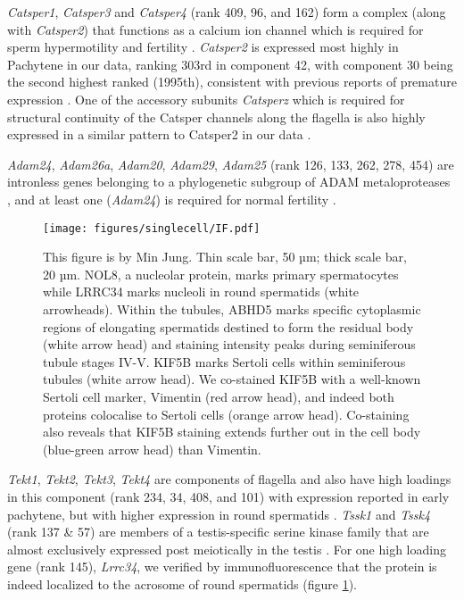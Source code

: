 \textit{Catsper1}, \textit{Catsper3} and \textit{Catsper4} (rank 409, 96, and 162) form a complex (along with \textit{Catsper2}) that functions as a calcium ion channel which is required for sperm hypermotility and fertility \parencite{Ren2001sperm, Lobley2003Identification, Qi2007All, Jin2007Catsper3}.
\textit{Catsper2} is expressed most highly in Pachytene in our data, ranking 303rd in component 42, with component 30 being the second highest ranked (1995th), consistent with previous reports of premature expression \parencite{Schultz2003multitude}.
One of the accessory subunits \textit{Catsperz} which is required for structural continuity of the Catsper channels along the flagella is also highly expressed in a similar pattern to Catsper2 in our data \parencite{Chung2017CatSperz}.

\textit{Adam24}, \textit{Adam26a}, \textit{Adam20}, \textit{Adam29}, \textit{Adam25} (rank 126, 133, 262, 278, 454) are intronless genes belonging to a phylogenetic subgroup of ADAM metaloproteases \parencite{Choi2004Characterization}, and at least one (\textit{Adam24}) is required for normal fertility \parencite{Zhu2009Testase}.


\begin{figure}[H]
	\centering
	\texttt{[image: figures/singlecell/IF.pdf]}
	\caption[Novel Immunofluorescence Markers]{
		This figure is by Min Jung.
		Thin scale bar, 50 µm; thick scale bar, 20 µm.
		NOL8, a nucleolar protein, marks primary spermatocytes while LRRC34 marks nucleoli in round spermatids (white arrowheads).
		Within the tubules, ABHD5 marks specific cytoplasmic regions of elongating spermatids destined to form the residual body (white arrow head) and staining intensity peaks during seminiferous tubule stages IV-V.
		KIF5B marks Sertoli cells within seminiferous tubules (white arrow head).
		We co-stained KIF5B with a well-known Sertoli cell marker, Vimentin (red arrow head), and indeed both proteins colocalise to Sertoli cells (orange arrow head).
		Co-staining also reveals that KIF5B staining extends further out in the cell body (blue-green arrow head) than Vimentin.
	}
	\label{fig:IF}
\end{figure}


\textit{Tekt1}, \textit{Tekt2}, \textit{Tekt3}, \textit{Tekt4} are components of flagella \parencite{Amos2008tektin} and also have high loadings in this component (rank 234, 34, 408, and 101) with expression reported in early pachytene, but with higher expression in round spermatids \parencite{Fallahi2010Global}.
\textit{Tssk1} and \textit{Tssk4} (rank 137 \& 57) are members of a testis-specific serine kinase family that are almost exclusively expressed post meiotically in the testis \parencite{Li2011Expression}.
For one high loading gene (rank 145), \textit{Lrrc34}, we verified by immunofluorescence that the protein is indeed localized to the acrosome of round spermatids (figure \ref{fig:IF}).


